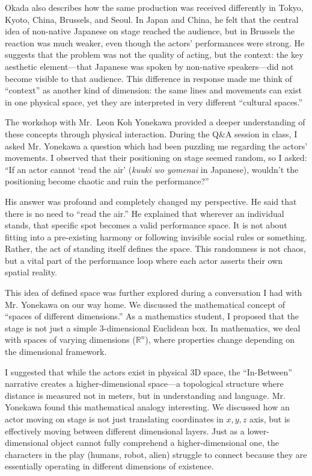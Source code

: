 \documentclass[12pt]{article}
\begin{document}
Okada also describes how the same production was received differently in Tokyo, Kyoto, China, Brussels, and Seoul. In Japan and China, he felt that the central idea of non-native Japanese on stage reached the audience, but in Brussels the reaction was much weaker, even though the actors’ performances were strong. He suggests that the problem was not the quality of acting, but the context: the key aesthetic element—that Japanese was spoken by non-native speakers—did not become visible to that audience. This difference in response made me think of “context” as another kind of dimension: the same lines and movements can exist in one physical space, yet they are interpreted in very different “cultural spaces.”

The workshop with Mr.\ Leon Koh Yonekawa provided a deeper understanding of these concepts through physical interaction. During the Q\&A session in class, I asked Mr. Yonekawa a question which had been puzzling me regarding the actors' movements. I observed that their positioning on stage seemed random, so I asked: ``If an actor cannot `read the air' (\textit{kuuki wo yomenai} in Japanese), wouldn't the positioning become chaotic and ruin the performance?'' 

His answer was profound and completely changed my perspective. He said that there is no need to ``read the air.'' He explained that wherever an individual stands, that specific spot becomes a valid performance space. It is not about fitting into a pre-existing harmony or following invisible social rules or something. Rather, the act of standing itself defines the space. This randomness is not chaos, but a vital part of the performance loop where each actor asserts their own spatial reality.

This idea of defined space was further explored during a conversation I had with Mr. Yonekawa on our way home. We discussed the mathematical concept of ``spaces of different dimensions.'' As a mathematics student, I proposed that the stage is not just a simple 3-dimensional Euclidean box. In mathematics, we deal with spaces of varying dimensions ($\mathbb{R}^n$), where properties change depending on the dimensional framework.

I suggested that while the actors exist in physical 3D space, the ``In-Between'' narrative creates a higher-dimensional space—a topological structure where distance is measured not in meters, but in understanding and language. Mr. Yonekawa found this mathematical analogy interesting. We discussed how an actor moving on stage is not just translating coordinates in $x, y, z$ axis, but is effectively moving between different dimensional layers. Just as a lower-dimensional object cannot fully comprehend a higher-dimensional one, the characters in the play (humans, robot, alien) struggle to connect because they are essentially operating in different dimensions of existence.
\end{document}
